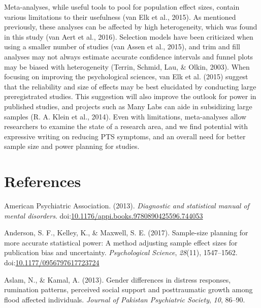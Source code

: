 \documentclass[english,man]{apa6}
\theoremstyle{definition}
\theoremstyle{definition}
\theoremstyle{definition}
\theoremstyle{remark}
\begin{document}
Meta-analyses, while useful tools to pool for population effect sizes,
contain various limitations to their usefulness (van Elk et al., 2015).
As mentioned previously, these analyses can be affected by high
heterogeneity, which was found in this study (van Aert et al., 2016).
Selection models have been criticized when using a smaller number of
studies (van Assen et al., 2015), and trim and fill analyses may not
always estimate accurate confidence intervals and funnel plots may be
biased with heterogeneity (Terrin, Schmid, Lau, \& Olkin, 2003). When
focusing on improving the psychological sciences, van Elk et al. (2015)
suggest that the reliability and size of effects may be best elucidated
by conducting large preregistrated studies. This suggestion will also
improve the outlook for power in published studies, and projects such as
Many Labs can aide in subsidizing large samples (R. A. Klein et al.,
2014). Even with limitations, meta-analyses allow researchers to examine
the state of a research area, and we find potential with expressive
writing on reducing PTS symptoms, and an overall need for better sample
size and power planning for studies.

\newpage

\section{References}\label{references}

\setlength{\parindent}{-0.5in} \setlength{\leftskip}{0.5in}

\hypertarget{refs}{}
\hypertarget{ref-AmericanPsychiatricAssociation2013}{}
American Psychiatric Association. (2013). \emph{Diagnostic and
statistical manual of mental disorders}.
doi:\href{https://doi.org/10.1176/appi.books.9780890425596.744053}{10.1176/appi.books.9780890425596.744053}

\hypertarget{ref-Anderson2017a}{}
Anderson, S. F., Kelley, K., \& Maxwell, S. E. (2017). Sample-size
planning for more accurate statistical power: A method adjusting sample
effect sizes for publication bias and uncertainty. \emph{Psychological
Science}, \emph{28}(11), 1547--1562.
doi:\href{https://doi.org/10.1177/0956797617723724}{10.1177/0956797617723724}

\hypertarget{ref-Aslam2013}{}
Aslam, N., \& Kamal, A. (2013). Gender differences in distress
responses, rumination patterns, perceived social support and
posttraumatic growth among flood affected individuals. \emph{Journal of
Pakistan Psychiatric Society}, \emph{10}, 86--90.
\end{document}
